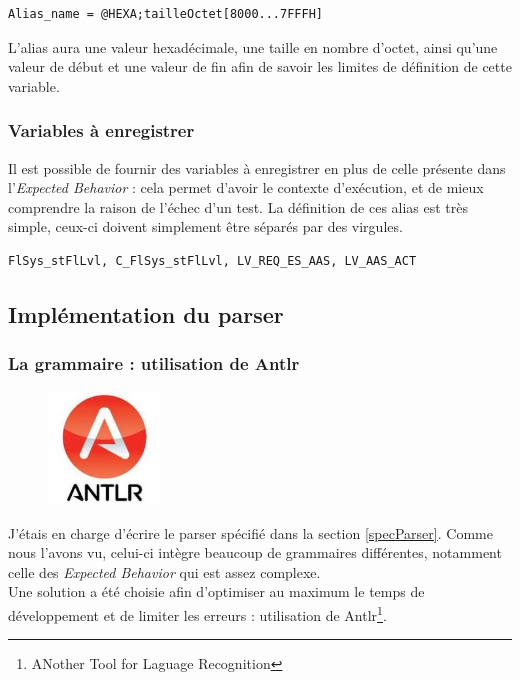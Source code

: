 \begin{lstlisting}[caption=Exemple de définition d'alias local, language=Algo]
Alias_name = @HEXA;tailleOctet[8000...7FFFH]
\end{lstlisting}
L'alias aura une valeur hexadécimale, une taille en nombre d'octet, ainsi qu'une valeur de début et une valeur de fin afin de savoir les limites de définition de cette variable.

\subsubsection{Variables à enregistrer}
Il est possible de fournir des variables à enregistrer en plus de celle présente dans l'\textit{Expected Behavior} : cela permet d'avoir le contexte d'exécution, et de mieux comprendre la raison de l'échec d'un test. La définition de ces alias est très simple, ceux-ci doivent simplement être séparés par des virgules.

\begin{lstlisting}[caption=Exemple de définition d'alias à enregistrer, language=Algo]
FlSys_stFlLvl, C_FlSys_stFlLvl, LV_REQ_ES_AAS, LV_AAS_ACT
\end{lstlisting}

	\subsection{Implémentation du parser}
		\subsubsection{La grammaire : utilisation de Antlr}
		\begin{figure}
			\includegraphics[width=3cm]{contents/images/antlr.jpg}
		\end{figure}
		J'étais en charge d'écrire le parser spécifié dans la section \ref{specParser}. Comme nous l'avons vu, celui-ci intègre beaucoup de grammaires différentes, notamment celle des \textit{Expected Behavior} qui est assez complexe. \\
		Une solution a été choisie afin d'optimiser au maximum le temps de développement et de limiter les erreurs : utilisation de Antlr\footnote{ANother Tool for Laguage Recognition}.


